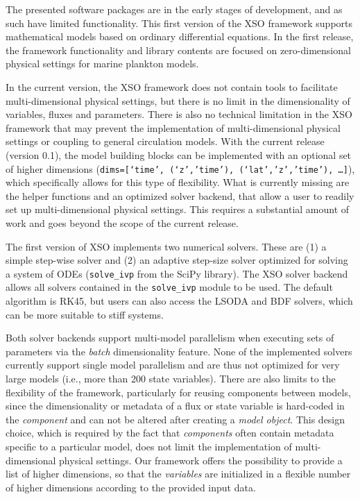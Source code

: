 \documentclass[gmd, manuscript]{copernicus}
\begin{document}
The presented software packages are in the early stages of development, and as such have limited functionality. This first version of the XSO framework supports mathematical models based on ordinary differential equations. In the first release, the framework functionality and library contents are focused on zero-dimensional physical settings for marine plankton models. 

In the current version, the XSO framework does not contain tools to facilitate multi-dimensional physical settings, but there is no limit in the dimensionality of variables, fluxes and parameters. There is also no technical limitation in the XSO framework that may prevent the implementation of multi-dimensional physical settings or coupling to general circulation models. With the current release (version 0.1), the model building blocks can be implemented with an optional set of higher dimensions (\texttt{dims=[‘time’, (‘z’,’time’), (‘lat’,’z’,’time’), …]}), which specifically allows for this type of flexibility. What is currently missing are the helper functions and an optimized solver backend, that allow a user to readily set up multi-dimensional physical settings. This requires a substantial amount of work and goes beyond the scope of the current release.

The first version of XSO implements two numerical solvers. These are (1) a simple step-wise solver and (2) an adaptive step-size solver optimized for solving a system of ODEs (\texttt{solve\_ivp} from the SciPy library). The XSO solver backend allows all solvers contained in the \texttt{solve\_ivp} module to be used. The default algorithm is RK45, but users can also access the LSODA and BDF solvers, which can be more suitable to stiff systems. 

Both solver backends support multi-model parallelism when executing sets of parameters via the \textit{batch} dimensionality feature. None of the implemented solvers currently support single model parallelism and are thus not optimized for very large models (i.e., more than 200 state variables). There are also limits to the flexibility of the framework, particularly for reusing components between models, since the dimensionality or metadata of a flux or state variable is hard-coded in the \textit{component} and can not be altered after creating a \textit{model object}. This design choice, which is required by the fact that \textit{components} often contain metadata specific to a particular model, does not limit the implementation of multi-dimensional physical settings. Our framework offers the possibility to provide a list of higher dimensions, so that the \textit{variables} are initialized in a flexible number of higher dimensions according to the provided input data.
\end{document}
